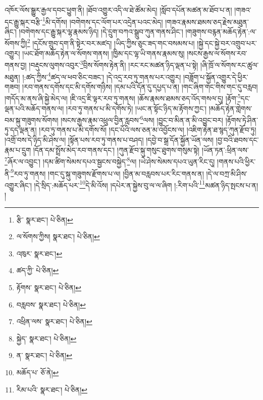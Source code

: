 འཁོར་ལོས་སྒྱུར་རྒྱལ་དབང་ཕྱུག་ནི། །ཐོབ་འགྱུར་འདི་ལ་ཐེ་ཚོམ་མེད། །སློབ་དཔོན་མཚན་མ་ཐོབ་པ་ན། །གཟའ་དང་རྒྱུ་སྐར་བརྩི་\footnote{རྩི་  སྣར་ཐང་།  པེ་ཅིན། }མི་དགོས། །བགེགས་དང་ལོག་པར་འདྲེན་པའང་མེད། །གཟའ་རྣམས་ཐམས་ཅད་རྗེས་མཐུན་ཞིང་། །བགེགས་དང་རྒྱུ་སྐར་ལྷ་རྣམས་ཉིད། །དེ་དྲུག་བཀའ་སྒྲུབ་ཀུན་གནས་ཤིང་། །གཟུགས་བརྙན་མཆོད་རྟེན་:ལ་སོགས་ཀྱི།\footnote{ལ་སོགས་ཀྱིས།  སྣར་ཐང་།  པེ་ཅིན། } །དངོས་གྲུབ་དག་ནི་སྟེར་བར་མཛད། །ཡིད་ཀྱིས་ཅུང་ཟད་གང་བསམས་པ། །སྐྱེ་དང་སྐྱེ་བར་འགྲུབ་པར་འགྱུར། །ཡང་ཐོག་མཆོད་རྟེན་ལ་སོགས་གནས། །ཁྱིམ་དང་ལྷ་ཡི་གནས་རྣམས་སུ། །སངས་རྒྱས་ལ་སོགས་རབ་གནས་བྱ། །བརྡུངས་ལུགས་འབུར་\footnote{འཁུར་  སྣར་ཐང་། }བྲིས་སོགས་རྟེན་ནི། །རང་རང་མཚན་ཉིད་ལྡན་པ་སྟེ། །ཞི་ཁྲོ་ལ་སོགས་རང་ཚུལ་མཐུན། །:ཚད་ཀྱིས་\footnote{ཚད་ཀྱི་  པེ་ཅིན། }ཚད་ལ་ཕབ་ཅིང་བཟང་། །དེ་འདྲ་རབ་ཏུ་གནས་པར་འགྱུར། །བཟློག་པ་སྐྱོན་འགྱུར་དེ་ཕྱིར་གཟབ། །རབ་གནས་དགོས་དང་མི་དགོས་གཉིས། །དམ་པའི་དོན་དུ་དཔྱད་པ་ན། །གང་ཞིག་གང་གིས་གང་དུ་བརླབ། །གདོད་མ་ནས་ཞི་སྐྱེ་མེད་ལ། །ཇི་འདྲ་ཇི་ལྟར་རབ་ཏུ་གནས། །ཆོས་རྣམས་ཐམས་ཅད་འོད་གསལ་དུ། །རྟོག་\footnote{རྟོགས་  སྣར་ཐང་།  པེ་ཅིན། }དང་ལྡན་པའི་མཆོད་གནས་ལ། །རབ་ཏུ་གནས་པ་མི་དགོས་ཏེ། །ཡང་ན་སྟོང་ཉིད་མ་རྟོགས་ཀྱང་། །མཆོད་རྟེན་གླེགས་བམ་སྐུ་གཟུགས་སོགས། །སངས་རྒྱས་རྣམ་འཕྲུལ་བྱིན་རླབས་\footnote{བརླབས་  སྣར་ཐང་།  པེ་ཅིན། }ལས། །བྱུང་བ་མིན་ན་མི་འབྱུང་བར། །རྟོགས་ཏེ་ཤིན་ཏུ་དད་ལྡན་ན། །རབ་ཏུ་གནས་པ་མི་དགོས་སོ། །དང་པོའི་ལས་ཅན་མ་འབྱོངས་ལ། །འཇིག་རྟེན་ཐ་སྙད་ཀུན་རྫོབ་ཏུ། །འགྲོ་བས་དེ་ཉིད་མི་ཤེས་ལ། །སྟོན་པས་རབ་ཏུ་གནས་པ་བཤད། །དབྱེ་བ་སྒྲ་དོན་སྐྱོན་ཡོན་ལས། །བྱ་བའི་ཐབས་དང་རྣམ་པ་དྲུག །དོན་དམ་སྤྲོས་མེད་རབ་གནས་དང་། །ཀུན་རྫོབ་སྐུ་གསུང་ཐུགས་གསུམ་སྟེ། །ཡོན་ཏན་:ཕྲིན་ལས་\footnote{འཕྲིན་ལས་  སྣར་ཐང་།  པེ་ཅིན། }ཞོར་ལ་འབྱུང་། །དམ་ཚིག་སེམས་དཔའ་སྦྱངས་བསྐྱེད་\footnote{སྐྱེད་  སྣར་ཐང་།  པེ་ཅིན། }ལ། །ཡེ་ཤེས་སེམས་དཔའ་ཡུན་རིང་དུ། །གནས་པའི་ཕྱིར་ནི་\footnote{ན་  སྣར་ཐང་།  པེ་ཅིན། }རབ་ཏུ་གནས། །གང་དུ་སྐུ་གཟུགས་རྫོགས་པ་ལ། །བྱིན་མ་བརླབས་པར་རིང་གནས་ན། །དེ་ལ་བཀྲ་མི་ཤིས་འགྱུར་ཞིང་། །དེ་སྲིད་:མཆོད་པར་\footnote{མཆོད་པ་  ཅོ་ནེ། }དེ་མི་འོས། །དཔེར་ན་སྐྱེས་བུ་ལ་ལ་ཞིག །:རིག་པའི་\footnote{རིམ་པའི་  སྣར་ཐང་།  པེ་ཅིན། }མཚན་ཉིད་སྤངས་པ་ན། །
